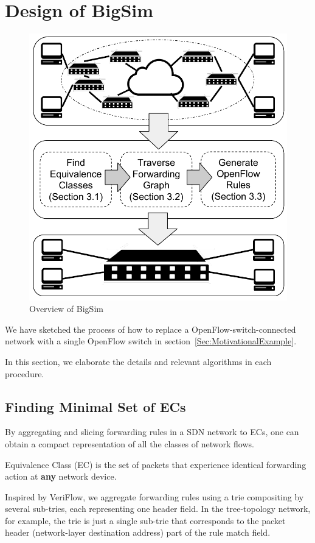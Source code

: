\section{Design of BigSim}

\begin{figure}[t]
\centering
\includegraphics[scale=.6]{figures/BigSimOverview.pdf}
\caption{Overview of BigSim}
\label{Fig:BigSimOverview}
\end{figure}

We have sketched the process of how to replace a OpenFlow-switch-connected network
with a single OpenFlow switch in section~\ref{Sec:MotivationalExample}.

In this section, we elaborate the details and relevant algorithms
in each procedure.

\subsection{Finding Minimal Set of ECs}
By aggregating and slicing forwarding rules in a SDN network to ECs,
one can obtain a compact representation of all the classes of network flows.
\begin{definition}
Equivalence Class (EC) is the set of packets that
experience identical forwarding action at \textbf{any} network device.
\end{definition}
Inspired by VeriFlow\cite{Veriflow}, we aggregate forwarding rules using a trie
compositing by several sub-tries, each representing one header field.
In the tree-topology network, for example, the trie is just a single sub-trie that
corresponds to the packet header (network-layer destination address)
part of the rule match field.


